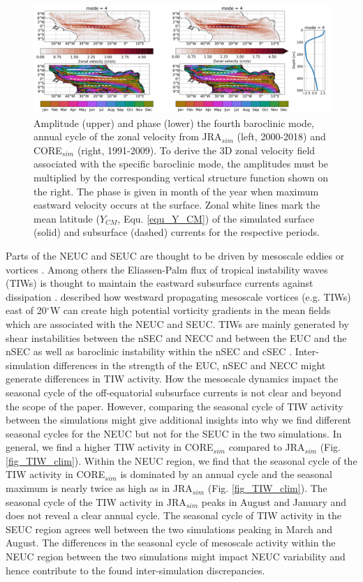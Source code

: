 \documentclass[os, manuscript]{copernicus}
\begin{document}
	\begin{figure}[t]
		\includegraphics[width=12cm]{../../figures/paper/f06_INALT20_AH_MODE4.png}
		\caption{Amplitude (upper) and phase (lower) the fourth baroclinic mode, annual cycle of the zonal velocity from JRA$_{sim}$ (left, 2000-2018) and CORE$_{sim}$ (right, 1991-2009). To derive the 3D zonal velocity field associated with the specific baroclinic mode, the amplitudes must be multiplied by the corresponding vertical structure function shown on the right. The phase is given in month of the year when maximum eastward velocity occurs at the surface. Zonal white lines mark the mean latitude ($ Y_{CM} $, Equ. \ref{equ_Y_CM}) of the simulated surface (solid) and subsurface (dashed) currents for the respective periods.}
		\label{fig_MODE4_AH}
	\end{figure}
	
	Parts of the NEUC and SEUC are thought to be driven by mesoscale eddies or vortices \citep[e.g. ][]{Jochum2004b,Assene2020}. Among others the Eliassen-Palm flux of tropical instability waves (TIWs) is thought to maintain the eastward subsurface currents against dissipation \citep{Jochum2004b}. \cite{Assene2020} described how westward propagating mesoscale vortices (e.g. TIWs) east of 20$^{\circ}$W can create high potential vorticity gradients in the mean fields which are associated with the NEUC and SEUC. TIWs are mainly generated by shear instabilities between the nSEC and NECC \citep{Philander1978,Athie2008} and between the EUC and the nSEC as well as baroclinic instability within the nSEC and cSEC \citep{Weisberg1988,Jochum2004,VonSchuckmann2008}. Inter-simulation differences in the strength of the EUC, nSEC and NECC might generate differences in TIW activity. How the mesoscale dynamics impact the seasonal cycle of the off-equatorial subsurface currents is not clear and beyond the scope of the paper. However, comparing the seasonal cycle of TIW activity between the simulations might give additional insights into why we find different seasonal cycles for the NEUC but not for the SEUC in the two simulations. In general, we find a higher TIW activity in CORE$_{sim}$ compared to JRA$_{sim}$ (Fig. \ref{fig_TIW_clim}). Within the NEUC region, we find that the seasonal cycle of the TIW activity in CORE$_{sim}$ is dominated by an annual cycle and the seasonal maximum is nearly twice as high as in JRA$_{sim}$ (Fig. \ref{fig_TIW_clim}). The seasonal cycle of the TIW activity in JRA$_{sim}$ peaks in August and January and does not reveal a clear annual cycle. The seasonal cycle of TIW activity in the SEUC region agrees well between the two simulations peaking in March and August. The differences in the seasonal cycle of mesoscale activity within the NEUC region between the two simulations might impact NEUC variability and hence contribute to the found inter-simulation discrepancies. 
	
\end{document}

